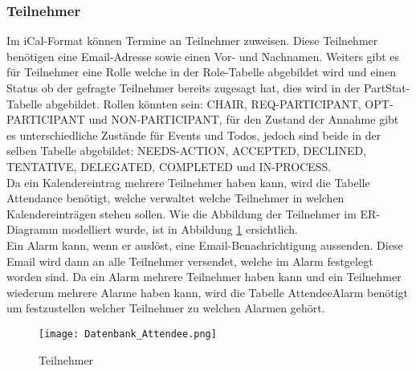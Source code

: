 \subsubsection*{Teilnehmer}
\label{ref:teilnehmer}
Im iCal-Format können Termine an Teilnehmer zuweisen. Diese Teilnehmer benötigen eine Email-Adresse sowie einen Vor- und Nachnamen. Weiters gibt es für Teilnehmer eine Rolle welche in der Role-Tabelle abgebildet wird und einen Status ob der gefragte Teilnehmer bereits zugesagt hat, dies wird in der PartStat-Tabelle abgebildet. Rollen könnten sein: CHAIR, REQ-PARTICIPANT, OPT-PARTICIPANT und NON-PARTICIPANT, für den Zustand der Annahme gibt es unterschiedliche Zustände für Events und Todos, jedoch sind beide in der selben Tabelle abgebildet: NEEDS-ACTION, ACCEPTED, DECLINED, TENTATIVE, DELEGATED, COMPLETED und IN-PROCESS.\\
Da ein Kalendereintrag mehrere Teilnehmer haben kann, wird die Tabelle Attendance benötigt, welche verwaltet welche Teilnehmer in welchen Kalendereinträgen stehen sollen. Wie die Abbildung der Teilnehmer im ER-Diagramm modelliert wurde, ist in Abbildung \ref{fig:datenbankTeilnehmer} ersichtlich.\\
Ein Alarm kann, wenn er auslöst, eine Email-Benachrichtigung aussenden. Diese Email wird dann an alle Teilnehmer versendet, welche im Alarm festgelegt worden sind. Da ein Alarm mehrere Teilnehmer haben kann und ein Teilnehmer wiederum mehrere Alarme haben kann, wird die Tabelle AttendeeAlarm benötigt um festzustellen welcher Teilnehmer zu welchen Alarmen gehört.
\begin{figure}[H]
	\texttt{[image: Datenbank\_Attendee.png]}
    \caption{Teilnehmer}
    \label{fig:datenbankTeilnehmer}
\end{figure}
\pagebreak